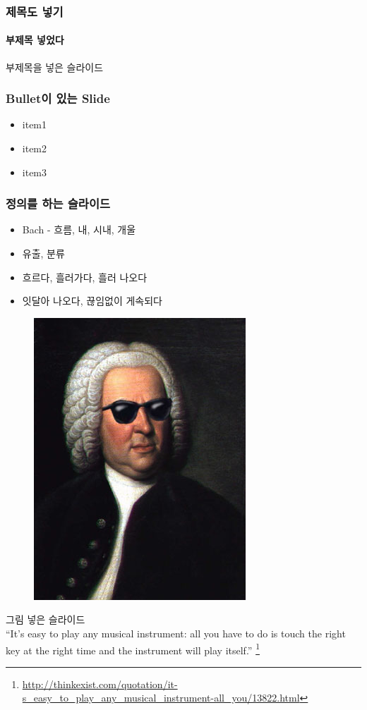 \documentclass{beamer}
\begin{document}
\begin{frame}
\end{frame}

\begin{frame}
	\frametitle{제목도 넣기}
	\framesubtitle{부제목 넣었다}
	부제목을 넣은 슬라이드
\end{frame}

\begin{frame}
	\frametitle{Bullet이 있는 Slide}
	\begin{itemize}
		\item item1
		\item item2
		\item item3
	\end{itemize}
\end{frame}

\begin{frame}
	\frametitle{정의를 하는 슬라이드}
	\begin{definition}[영어 단어 Stream]
		\begin{itemize}
			\item Bach - 흐름, 내, 시내, 개울
			\item 유출, 분류
			\item 흐르다, 흘러가다, 흘러 나오다
			\item 잇달아 나오다, 끊임없이 게속되다
		\end{itemize}
	\end{definition}
\end{frame}

\begin{frame}
	\begin{figure}
	\includegraphics[width=0.3\columnwidth]{jpg/bach_shades.jpg}
	\end{figure}
	그림 넣은 슬라이드 \\
	``It's easy to play any musical instrument: all you have to do is touch the right key at the right time and the instrument will play itself.''
	\footnote{\url{http://thinkexist.com/quotation/it-s_easy_to_play_any_musical_instrument-all_you/13822.html}}
\end{frame}
\end{document}
